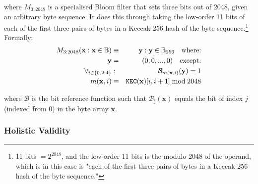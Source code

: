 \documentclass[9pt,oneside]{amsart}
\begin{document}
\begin{multicols}{2}
where $M_{3:2048}$ is a specialised Bloom filter that sets three bits out of 2048, given an arbitrary byte sequence. It does this through taking the low-order 11 bits of each of the first three pairs of bytes in a Keccak-256 hash of the byte sequence.\footnote{11 bits $= 2^{2048}$, and the low-order 11 bits is the modulo 2048 of the operand, which is in this case is "each of the first three pairs of bytes in a Keccak-256 hash of the byte sequence."} Formally:
\begin{eqnarray}
M_{3:2048}(\mathbf{x}: \mathbf{x} \in \mathbb{B}) & \equiv & \mathbf{y}: \mathbf{y} \in \mathbb{B}_{256} \quad \text{where:}\\
\mathbf{y} & = & (0, 0, ..., 0) \quad \text{except:}\\
\forall_{i \in \{0, 2, 4\}}&:& \mathcal{B}_{m(\mathbf{x}, i)}(\mathbf{y}) = 1\\
m(\mathbf{x}, i) &\equiv& \mathtt{\tiny KEC}(\mathbf{x})[i, i + 1] \bmod 2048
\end{eqnarray}

where $\mathcal{B}$ is the bit reference function such that $\mathcal{B}_{\mathrm{j}}(\mathbf{x})$ equals the bit of index $j$ (indexed from 0) in the byte array $\mathbf{x}$.

\subsubsection{Holistic Validity}


\end{multicols}
\end{document}
